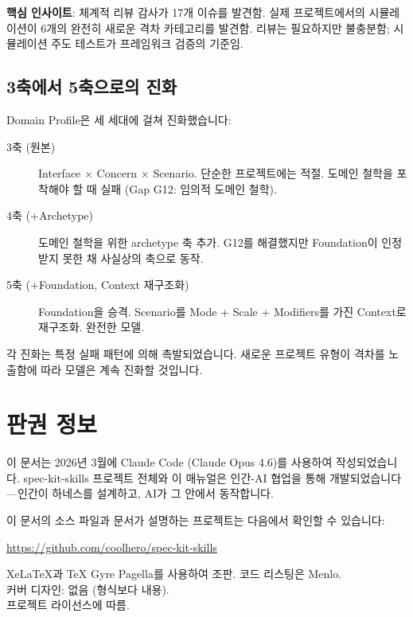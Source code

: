 \documentclass[11pt,a4paper,openright,twoside]{report}
\begin{document}
\textbf{핵심 인사이트}: 체계적 리뷰 감사가 17개 이슈를 발견함. 실제 프로젝트에서의 시뮬레이션이 6개의 완전히 새로운 격차 카테고리를 발견함. 리뷰는 필요하지만 불충분함; 시뮬레이션 주도 테스트가 프레임워크 검증의 기준임.

\section{3축에서 5축으로의 진화}

Domain Profile은 세 세대에 걸쳐 진화했습니다:

\begin{description}
  \item[3축 (원본)] Interface $\times$ Concern $\times$ Scenario. 단순한 프로젝트에는 적절. 도메인 철학을 포착해야 할 때 실패 (Gap G12: 임의적 도메인 철학).
  \item[4축 (+Archetype)] 도메인 철학을 위한 archetype 축 추가. G12를 해결했지만 Foundation이 인정받지 못한 채 사실상의 축으로 동작.
  \item[5축 (+Foundation, Context 재구조화)] Foundation을 승격. Scenario를 Mode + Scale + Modifiers를 가진 Context로 재구조화. 완전한 모델.
\end{description}

각 진화는 특정 실패 패턴에 의해 촉발되었습니다. 새로운 프로젝트 유형이 격차를 노출함에 따라 모델은 계속 진화할 것입니다.



\chapter*{판권 정보}

이 문서는 2026년 3월에 Claude Code (Claude Opus 4.6)를 사용하여 작성되었습니다. spec-kit-skills 프로젝트 전체와 이 매뉴얼은 인간-AI 협업을 통해 개발되었습니다---인간이 하네스를 설계하고, AI가 그 안에서 동작합니다.

이 문서의 소스 파일과 문서가 설명하는 프로젝트는 다음에서 확인할 수 있습니다:

\begin{center}
\url{https://github.com/coolhero/spec-kit-skills}
\end{center}

\vfill
{\small
XeLaTeX과 TeX Gyre Pagella를 사용하여 조판. 코드 리스팅은 Menlo.\\
커버 디자인: 없음 (형식보다 내용).\\
프로젝트 라이선스에 따름.
}
\end{document}
